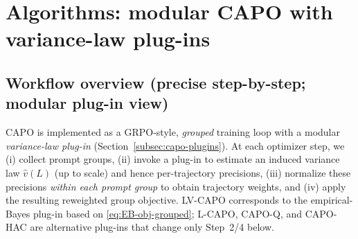 \section{Algorithms: modular CAPO with variance-law plug-ins}\label{sec:algorithms}
\label{sec:alg-eb-capo}

\subsection{Workflow overview (precise step-by-step; modular plug-in view)}
CAPO is implemented as a GRPO-style, \emph{grouped} training loop with a modular \emph{variance-law plug-in} (Section~\ref{subsec:capo-plugins}). At each optimizer step, we (i) collect prompt groups, (ii) invoke a plug-in to estimate an induced variance law $\widehat v(L)$ (up to scale) and hence per-trajectory precisions, (iii) normalize these precisions \emph{within each prompt group} to obtain trajectory weights, and (iv) apply the resulting reweighted group objective. LV-CAPO corresponds to the empirical-Bayes plug-in based on \eqref{eq:EB-obj-grouped}; L-CAPO, CAPO-Q, and CAPO-HAC are alternative plug-ins that change only Step~2/4 below.

